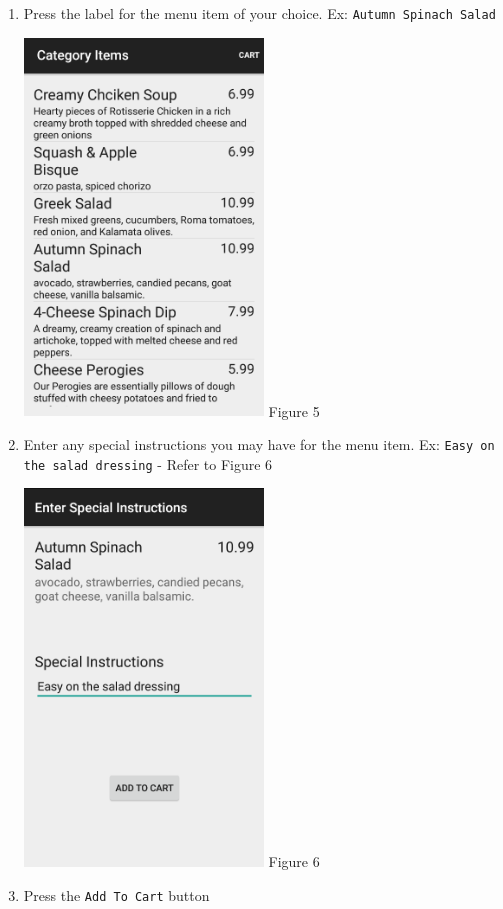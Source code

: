 \documentclass[12pt, titlepage]{article}
\begin{document}
\begin{enumerate}
		\item Press the label for the menu item of your choice. Ex: 					\texttt{Autumn Spinach Salad}
		\begin{center}
			\includegraphics[width=0.5\textwidth]{appetizers.png}
			\linebreak Figure 5
		\end{center}				
		
		\item Enter any special instructions you may have for the menu 					item. Ex: \texttt{Easy on the salad dressing} - Refer to Figure 			6
		\begin{center}
			\includegraphics[width=0.5\textwidth]{special-instructions.png}
			\linebreak Figure 6
		\end{center}		
	
		\item Press the \texttt{Add To Cart} button
	\end{enumerate}
\end{document}

